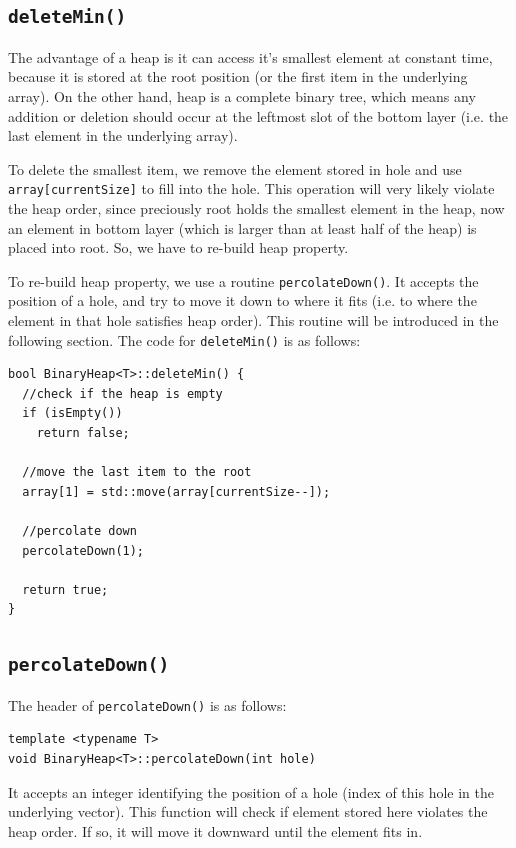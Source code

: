 \documentclass[11pt]{book}
\begin{document}
\subsection{\texttt{deleteMin()}}
\label{sec:orgc393808}

The advantage of a heap is it can access it's smallest element at constant time, because it is stored at the root position (or the first item in the underlying array). On the other hand, heap is a complete binary tree, which means any addition or deletion should occur at the leftmost slot of the bottom layer (i.e. the last element in the underlying array).

To delete the smallest item, we remove the element stored in hole and use \texttt{array[currentSize]} to fill into the hole. This operation will very likely violate the heap order, since preciously root holds the smallest element in the heap, now an element in bottom layer (which is larger than at least half of the heap) is placed into root. So, we have to re-build heap property.

To re-build heap property, we use a routine \texttt{percolateDown()}. It accepts the position of a hole, and try to move it down to where it fits (i.e. to where the element in that hole satisfies heap order). This routine will be introduced in the following section. The code for \texttt{deleteMin()} is as follows:
\begin{verbatim}
bool BinaryHeap<T>::deleteMin() {
  //check if the heap is empty 
  if (isEmpty())
    return false;

  //move the last item to the root
  array[1] = std::move(array[currentSize--]);

  //percolate down
  percolateDown(1);

  return true;
}
\end{verbatim}

\subsection{\texttt{percolateDown()}}
\label{sec:org546e6e1}

The header of \texttt{percolateDown()} is as follows:
\begin{verbatim}
template <typename T>
void BinaryHeap<T>::percolateDown(int hole)
\end{verbatim}

It accepts an integer identifying the position of a hole (index of this hole in the underlying vector). This function will check if element stored here violates the heap order. If so, it will move it downward until the element fits in.
\end{document}
